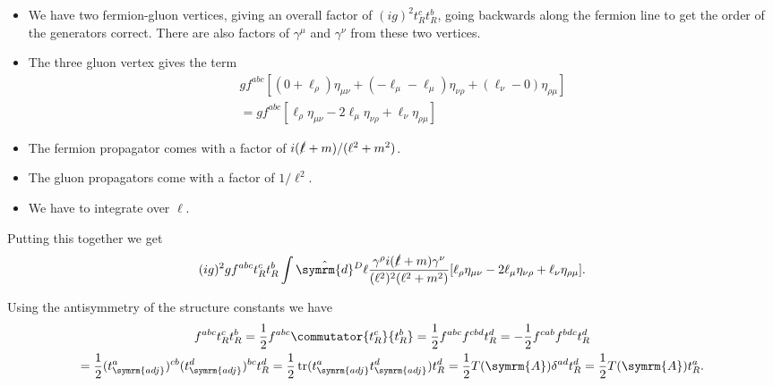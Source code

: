 \documentclass[fleqn]{NotesClass}
\newcommand{\dhat}[1]{\hat{\symrm{d}}{#1}}
\newcommand{\minkowskiMetric}{\eta}
\DeclareMathOperator{\tr}{tr}
\newcommand{\adj}{\symrm{adj}}
\newcommand{\adjointRep}{\symrm{A}}
\begin{document}
    \begin{itemize}
        \item We have two fermion-gluon vertices, giving an overall factor of \((ig)^2t_R^ct_R^b\), going backwards along the fermion line to get the order of the generators correct.
        There are also factors of \(\gamma^\mu\) and \(\gamma^\nu\) from these two vertices.
        \item The three gluon vertex gives the term
        \begin{multline}
            gf^{abc}[(0 + \ell_\rho)\minkowskiMetric_{\mu\nu} + (-\ell_\mu - \ell_\mu)\minkowskiMetric_{\nu\rho} + (\ell_\nu - 0)\minkowskiMetric_{\rho\mu}]\\
            = gf^{abc}[\ell_\rho \minkowskiMetric_{\mu\nu} - 2\ell_\mu\minkowskiMetric_{\nu\rho} + \ell_\nu\minkowskiMetric_{\rho\mu}]
        \end{multline}
        \item The fermion propagator comes with a factor of \(i(\slashed{\ell} + m)/(\ell^2 + m^2)\).
        \item The gluon propagators come with a factor of \(1/\ell^2\).
        \item We have to integrate over \(\ell\).
    \end{itemize}
    Putting this together we get
    \begin{equation}
        (ig)^2 g f^{abc} t_R^c t_R^b \int \dhat{^D\ell} \frac{\gamma^\rho i(\slashed{\ell} + m)\gamma^\nu}{(\ell^2)^2(\ell^2 + m^2)} [\ell_\rho \minkowskiMetric_{\mu\nu} - 2\ell_\mu\minkowskiMetric_{\nu\rho} + \ell_\nu\minkowskiMetric_{\rho\mu}].
    \end{equation}
    
    Using the antisymmetry of the structure constants we have
    \begin{multline}
        f^{abc}t_R^ct_R^b = \frac{1}{2}f^{abc}\commutator{t_R^c}{t_R^b} = \frac{1}{2}f^{abc}f^{cbd}t_R^d = -\frac{1}{2}f^{cab}f^{bdc}t_R^d\\
        = \frac{1}{2}(t_{\adj}^a)^{cb}(t_{\adj}^d)^{bc}t_R^d = \frac{1}{2}\tr(t_{\adj}^at_{\adj}^d)t_R^d = \frac{1}{2}T(\adjointRep)\delta^{ad}t_R^d = \frac{1}{2}T(\adjointRep)t_R^a.
    \end{multline}
    
\end{document}
